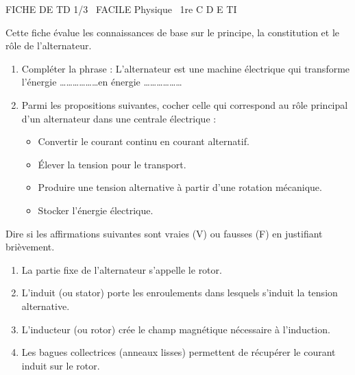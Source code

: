 \documentclass[11pt]{article}
\begin{document}
\begin{tcolorbox}[enhanced,colback=popink,colframe=popink,arc=10pt,boxrule=0pt,left=12pt,right=12pt,top=9pt,bottom=9pt]
{\color{white}\popxbold\small FICHE DE TD 1/3 \textbullet\ FACILE \hfill Physique \textbullet\ 1re C D E TI\par}
\end{tcolorbox}
\vspace{4pt}
Cette fiche évalue les connaissances de base sur le principe, la constitution et le rôle de l'alternateur.

\begin{exercice}
\begin{enumerate}
    \item Compléter la phrase : L'alternateur est une machine électrique qui transforme l'énergie \ldots\ldots\ldots\ldots\ldots\ldots en énergie \ldots\ldots\ldots\ldots\ldots\ldots
    \item Parmi les propositions suivantes, cocher celle qui correspond au rôle principal d'un alternateur dans une centrale électrique :
    \begin{itemize}
        \item[$\square$] Convertir le courant continu en courant alternatif.
        \item[$\square$] Élever la tension pour le transport.
        \item[$\square$] Produire une tension alternative à partir d'une rotation mécanique.
        \item[$\square$] Stocker l'énergie électrique.
    \end{itemize}
\end{enumerate}
\end{exercice}

\begin{exercice}
Dire si les affirmations suivantes sont vraies (V) ou fausses (F) en justifiant brièvement.
\begin{enumerate}
    \item La partie fixe de l'alternateur s'appelle le rotor.
    \item L'induit (ou stator) porte les enroulements dans lesquels s'induit la tension alternative.
    \item L'inducteur (ou rotor) crée le champ magnétique nécessaire à l'induction.
    \item Les bagues collectrices (anneaux lisses) permettent de récupérer le courant induit sur le rotor.
\end{enumerate}
\end{exercice}
\end{document}
